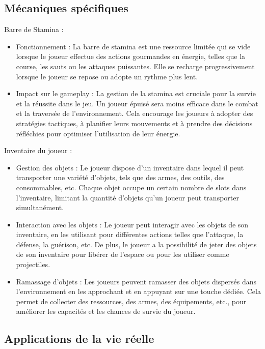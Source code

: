 \documentclass[
	article,			%
	11pt,				%
	oneside,			%
	a4paper,			%
	chapter=TITLE,
	french,			%
	sumario=tradicional
	]{base_nt}
\begin{document}
\subsection{Mécaniques spécifiques}

Barre de Stamina :

\begin{itemize}
    \item Fonctionnement : La barre de stamina est une ressource limitée qui se vide lorsque le joueur effectue des actions gourmandes en énergie, telles que la course, les sauts ou les attaques puissantes. Elle se recharge progressivement lorsque le joueur se repose ou adopte un rythme plus lent.
    \item Impact sur le gameplay : La gestion de la stamina est cruciale pour la survie et la réussite dans le jeu. Un joueur épuisé sera moins efficace dans le combat et la traversée de l'environnement. Cela encourage les joueurs à adopter des stratégies tactiques, à planifier leurs mouvements et à prendre des décisions réfléchies pour optimiser l'utilisation de leur énergie.
\end{itemize}

Inventaire du joueur :

\begin{itemize}
    \item Gestion des objets : Le joueur dispose d'un inventaire dans lequel il peut transporter une variété d'objets, tels que des armes, des outils, des consommables, etc. Chaque objet occupe un certain nombre de slots dans l'inventaire, limitant la quantité d'objets qu'un joueur peut transporter simultanément.
    \item Interaction avec les objets : Le joueur peut interagir avec les objets de son inventaire, en les utilisant pour différentes actions telles que l'attaque, la défense, la guérison, etc. De plus, le joueur a la possibilité de jeter des objets de son inventaire pour libérer de l'espace ou pour les utiliser comme projectiles.
    \item Ramassage d'objets : Les joueurs peuvent ramasser des objets dispersés dans l'environnement en les approchant et en appuyant sur une touche dédiée. Cela permet de collecter des ressources, des armes, des équipements, etc., pour améliorer les capacités et les chances de survie du joueur.
\end{itemize}

\newpage

\subsection{Applications de la vie réelle}
\end{document}
